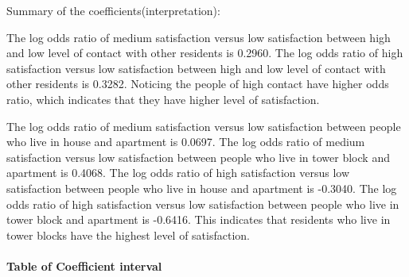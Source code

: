 \documentclass[]{article}
\newenvironment{Shaded}{\begin{snugshade}}{\end{snugshade}}
\newcommand{\KeywordTok}[1]{\textcolor[rgb]{0.13,0.29,0.53}{\textbf{#1}}}
\newcommand{\DataTypeTok}[1]{\textcolor[rgb]{0.13,0.29,0.53}{#1}}
\newcommand{\FloatTok}[1]{\textcolor[rgb]{0.00,0.00,0.81}{#1}}
\newcommand{\StringTok}[1]{\textcolor[rgb]{0.31,0.60,0.02}{#1}}
\newcommand{\OperatorTok}[1]{\textcolor[rgb]{0.81,0.36,0.00}{\textbf{#1}}}
\newcommand{\NormalTok}[1]{#1}
\let\oldparagraph\paragraph
\renewcommand{\paragraph}[1]{\oldparagraph{#1}\mbox{}}
\begin{document}
Summary of the coefficients(interpretation):

The log odds ratio of medium satisfaction versus low satisfaction
between high and low level of contact with other residents is 0.2960.
The log odds ratio of high satisfaction versus low satisfaction between
high and low level of contact with other residents is 0.3282. Noticing
the people of high contact have higher odds ratio, which indicates that
they have higher level of satisfaction.

The log odds ratio of medium satisfaction versus low satisfaction
between people who live in house and apartment is 0.0697. The log odds
ratio of medium satisfaction versus low satisfaction between people who
live in tower block and apartment is 0.4068. The log odds ratio of high
satisfaction versus low satisfaction between people who live in house
and apartment is -0.3040. The log odds ratio of high satisfaction versus
low satisfaction between people who live in tower block and apartment is
-0.6416. This indicates that residents who live in tower blocks have the
highest level of satisfaction.

\paragraph{Table of Coefficient
interval}\label{table-of-coefficient-interval}

\begin{Shaded}
\end{Shaded}
\end{document}

